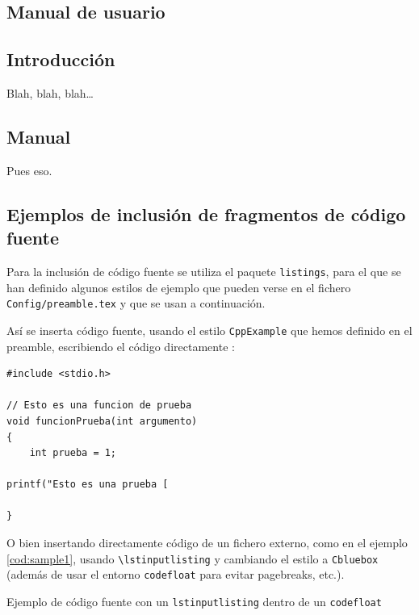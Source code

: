 \documentclass[spanish,openright]{book}
\begin{document}
\begin{appendices}



\chapter{Manual de usuario}
\label{cha:manual-de-usuario}

\section{Introducción}
\label{sec:intro-manual-de-usuario}

Blah, blah, blah\ldots


\section{Manual}
\label{sec:sec-manual-de-usuario}

Pues eso.


\section{Ejemplos de inclusión de fragmentos de código fuente}
\label{sec:codigo-fuente}

Para la inclusión de código fuente se utiliza el paquete
\texttt{listings}, para el que se han definido algunos estilos de
ejemplo que pueden verse en el fichero \texttt{Config/preamble.tex} y
que se usan a continuación.

Así se inserta código fuente, usando el estilo \texttt{CppExample} que
hemos definido en el preamble, escribiendo el código directamente :

\begin{lstlisting}[style=CppExample]
#include <stdio.h>

// Esto es una funcion de prueba
void funcionPrueba(int argumento)
{	
	int prueba = 1;

printf("Esto es una prueba [

}
\end{lstlisting}

O bien insertando directamente código de un fichero externo, como en el
ejemplo \ref{cod:sample1}, usando
\texttt{\textbackslash{}lstinputlisting} y cambiando el estilo a
\texttt{Cbluebox} (además de usar el entorno \texttt{codefloat} para
evitar pagebreaks, etc.).



\begin{codefloat}

\caption{Ejemplo de código fuente con un \texttt{lstinputlisting} dentro
de un \texttt{codefloat}}
\label{cod:sample1}
\end{codefloat}



\end{appendices}
\end{document}
